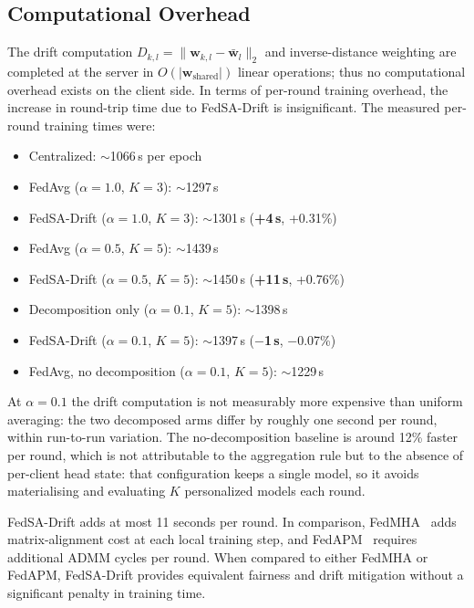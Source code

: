 \documentclass{ieeeaccess}
\newcommand{\sadrift}{FedSA-Drift}
\begin{document}
\subsection{Computational Overhead}
\label{sec:computational_overhead}

The drift computation $D_{k,l} = \|\mathbf{w}_{k,l} - \bar{\mathbf{w}}_l\|_2$ and inverse-distance weighting are completed at the server in $O(|\mathbf{w}_{\text{shared}}|)$ linear operations; thus no computational overhead exists on the client side. In terms of per-round training overhead, the increase in round-trip time due to \sadrift{} is insignificant. The measured per-round training times were:

\begin{itemize}
    \item Centralized: $\sim$1066\,s per epoch
    \item FedAvg ($\alpha{=}1.0$, $K{=}3$): $\sim$1297\,s
    \item \sadrift{} ($\alpha{=}1.0$, $K{=}3$): $\sim$1301\,s (\textbf{+4\,s}, +0.31\%)
    \item FedAvg ($\alpha{=}0.5$, $K{=}5$): $\sim$1439\,s
    \item \sadrift{} ($\alpha{=}0.5$, $K{=}5$): $\sim$1450\,s (\textbf{+11\,s}, +0.76\%)
    \item Decomposition only ($\alpha{=}0.1$, $K{=}5$): $\sim$1398\,s
    \item \sadrift{} ($\alpha{=}0.1$, $K{=}5$): $\sim$1397\,s (\textbf{$-$1\,s}, $-$0.07\%)
    \item FedAvg, no decomposition ($\alpha{=}0.1$, $K{=}5$): $\sim$1229\,s
\end{itemize}

At $\alpha{=}0.1$ the drift computation is not measurably more expensive than uniform averaging: the two decomposed arms differ by roughly one second per round, within run-to-run variation. The no-decomposition baseline is around 12\% faster per round, which is not attributable to the aggregation rule but to the absence of per-client head state: that configuration keeps a single model, so it avoids materialising and evaluating $K$ personalized models each round.

\sadrift{} adds at most 11 seconds per round. In comparison, FedMHA~\cite{Darzi2024} adds matrix-alignment cost at each local training step, and FedAPM~\cite{Zhu2025} requires additional ADMM cycles per round. When compared to either FedMHA or FedAPM, \sadrift{} provides equivalent fairness and drift mitigation without a significant penalty in training time.
\end{document}
